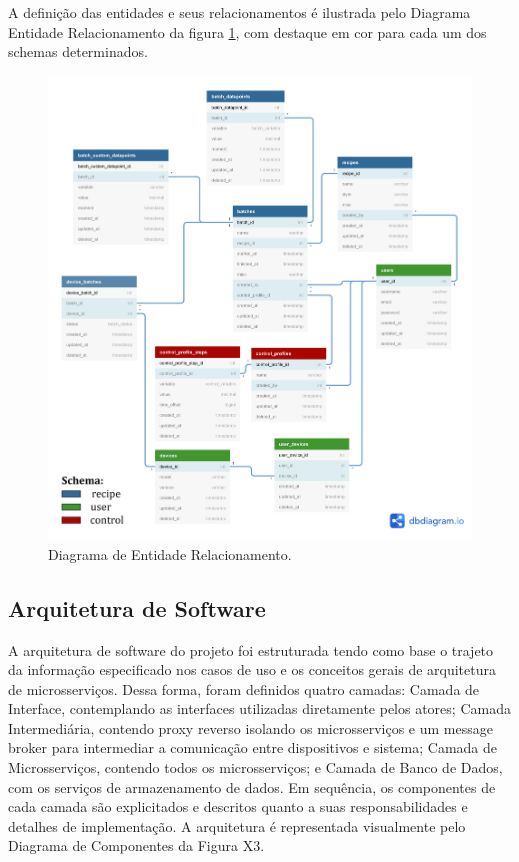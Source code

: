 A definição das entidades e seus relacionamentos é ilustrada pelo Diagrama Entidade Relacionamento da figura \ref{fig:bancodados}, com destaque em cor para cada um 
dos schemas determinados.

\begin{figure}[h]
    \centering
    \includegraphics[scale=0.15]{figuras/projeto/software/banco_de_dados.png}
    \caption{Diagrama de Entidade Relacionamento.}
    \label{fig:bancodados}
\end{figure}

\subsection{Arquitetura de Software}

A arquitetura de software do projeto foi estruturada tendo como base o trajeto da informação especificado nos casos de uso e os conceitos gerais de arquitetura de microsserviços. Dessa forma, foram definidos quatro camadas: Camada de Interface, contemplando as interfaces utilizadas diretamente pelos atores; Camada Intermediária, contendo proxy reverso isolando os microsserviços e um message broker para intermediar a comunicação entre dispositivos e sistema; Camada de Microsserviços, contendo todos os microsserviços; e Camada de Banco de Dados, com os serviços de armazenamento de dados. Em sequência, os componentes de cada camada são explicitados e descritos quanto a suas responsabilidades e detalhes de implementação. A arquitetura é representada visualmente pelo Diagrama de Componentes da Figura X3.

